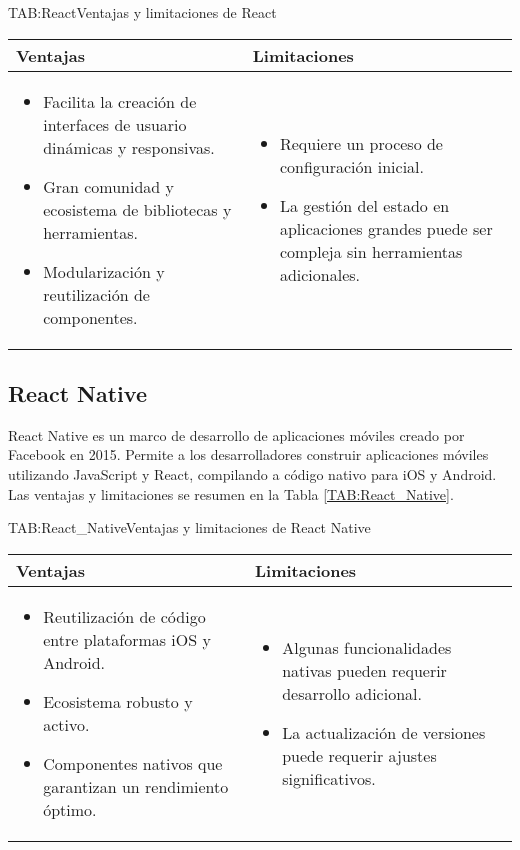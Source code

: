 \begin{table}[React]{TAB:React}{Ventajas y limitaciones de React}
  \begin{tabular}{|p{7cm}|p{7cm}|}
    \hline
    \textbf{Ventajas} & \textbf{Limitaciones} \\
    \hline
    \begin{itemize}
      \item Facilita la creación de interfaces de usuario dinámicas y responsivas.
      \item Gran comunidad y ecosistema de bibliotecas y herramientas.
      \item Modularización y reutilización de componentes.
    \end{itemize} &
    \begin{itemize}
      \item Requiere un proceso de configuración inicial.
      \item La gestión del estado en aplicaciones grandes puede ser compleja sin herramientas adicionales.
    \end{itemize} \\
    \hline
  \end{tabular}
\end{table}

\subsection{React Native}

React Native es un marco de desarrollo de aplicaciones móviles creado por Facebook en 2015. Permite a los desarrolladores construir aplicaciones móviles utilizando JavaScript y React, compilando a código nativo para iOS y Android. Las ventajas y limitaciones se resumen en la Tabla \ref{TAB:React_Native}.

\begin{table}[React Native]{TAB:React_Native}{Ventajas y limitaciones de React Native}
  \begin{tabular}{|p{7cm}|p{7cm}|}
    \hline
    \textbf{Ventajas} & \textbf{Limitaciones} \\
    \hline
    \begin{itemize}
      \item Reutilización de código entre plataformas iOS y Android.
      \item Ecosistema robusto y activo.
      \item Componentes nativos que garantizan un rendimiento óptimo.
    \end{itemize} &
    \begin{itemize}
      \item Algunas funcionalidades nativas pueden requerir desarrollo adicional.
      \item La actualización de versiones puede requerir ajustes significativos.
    \end{itemize} \\
    \hline
  \end{tabular}
\end{table}

